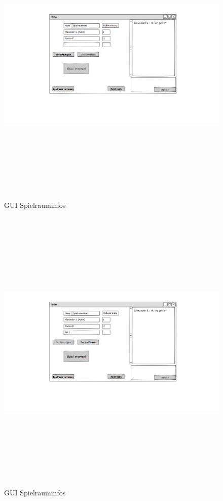 \begin{center}
	\begin{figure}
		\includegraphics[width=170mm, height =140mm]{PencilProjectData/spielrauminfosAdmin1}
		\caption{GUI Spielrauminfos}
	\end{figure}

	\begin{figure}
		\includegraphics[width=170mm, height =140mm]{PencilProjectData/spielrauminfosAdmin2}
		\caption{GUI Spielrauminfos}
	\end{figure}
	

\end{center}
